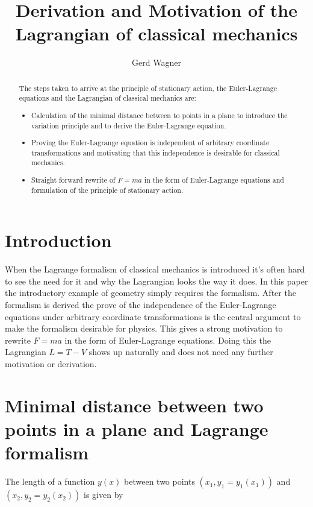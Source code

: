 \documentclass{article}
\begin{document}
\title{Derivation and Motivation of the Lagrangian of classical mechanics}
\author{Gerd Wagner}

\maketitle

\begin{abstract}
The steps taken to arrive at the principle of stationary action, the Euler-Lagrange equations and the Lagrangian of classical mechanics are:
\begin{itemize}
\item Calculation of the minimal distance between to points in a plane to introduce the variation principle and to derive the Euler-Lagrange equation.
\item Proving the Euler-Lagrange equation is independent of arbitrary coordinate transformations and motivating that this independence is desirable for classical mechanics.
\item Straight forward rewrite of $F=ma$ in the form of Euler-Lagrange equations and formulation of the principle of stationary action.
\end{itemize}
\end{abstract}


\section{Introduction}

When the Lagrange formalism of classical mechanics is introduced it's often hard to see the need for it and why the Lagrangian looks the way it does. In this paper the introductory example of geometry simply requires the formalism. 
After the formalism is derived the prove of the independence of the Euler-Lagrange equations under arbitrary coordinate transformations is the central argument to make the formalism desirable for physics.
This gives a strong motivation to rewrite $F=ma$ in the form of Euler-Lagrange equations. Doing this the Lagrangian $L=T-V$ shows up naturally and does not need any further motivation or derivation.

\section{Minimal distance between two points in a plane and Lagrange formalism \cite{Klopper}} 
The length of a function $y(x)$ between two points $(x_1,y_1=y_1(x_1))$ and $(x_2,y_2=y_2(x_2))$ is given by 
\end{document}
